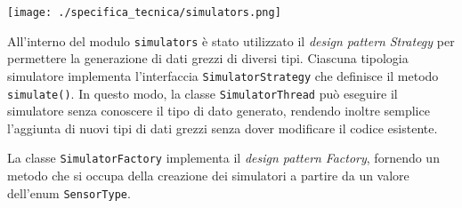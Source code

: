 \begin{center}
	\texttt{[image: ./specifica\_tecnica/simulators.png]}
\end{center}

All'interno del modulo \texttt{simulators} è stato utilizzato il \textit{design pattern} \textit{Strategy} per permettere la generazione di dati grezzi di diversi tipi.
Ciascuna tipologia simulatore implementa l'interfaccia \texttt{SimulatorStrategy} che definisce il metodo \texttt{simulate()}. In questo modo, la classe \texttt{SimulatorThread}
può eseguire il simulatore senza conoscere il tipo di dato generato, rendendo inoltre semplice l'aggiunta di nuovi tipi di dati grezzi senza dover modificare il codice esistente.

La classe \texttt{SimulatorFactory} implementa il \textit{design pattern} \textit{Factory}, fornendo un metodo che si occupa della creazione dei simulatori
a partire da un valore dell'enum \texttt{SensorType}.



